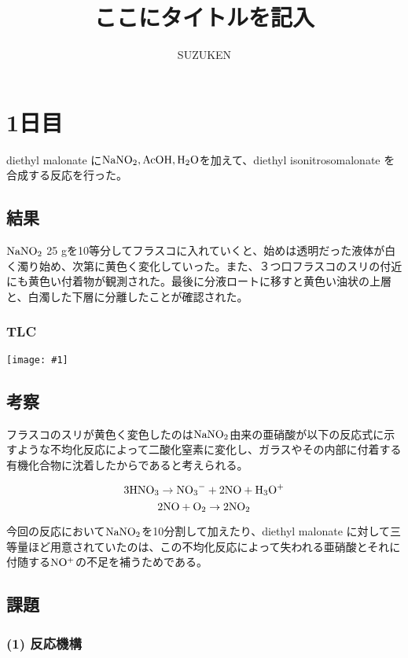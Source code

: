 \documentclass[a4paper,papersize,dvipdfmx]{jsarticle}
\newcommand{\pict}[2]{\begin{center} \texttt{[image: \#1]} \end{center}}   %
\begin{document}
\title{ここにタイトルを記入}
\author{SUZUKEN}
\date{}
\maketitle


\section*{1日目}
diethyl malonate に$\rm{NaNO_2, AcOH, H_2O}$を加えて、diethyl isonitrosomalonate を合成する反応を行った。


\subsection*{結果}
$\rm NaNO_2$ 25 gを10等分してフラスコに入れていくと、始めは透明だった液体が白く濁り始め、次第に黄色く変化していった。また、３つ口フラスコのスリの付近にも黄色い付着物が観測された。最後に分液ロートに移すと黄色い油状の上層と、白濁した下層に分離したことが確認された。

\subsubsection*{TLC}

\pict{imgs1/tlc.jpeg}{6}

\subsection*{考察}

フラスコのスリが黄色く変色したのは$\rm NaNO_2$由来の亜硝酸が以下の反応式に示すような不均化反応によって二酸化窒素に変化し、ガラスやその内部に付着する有機化合物に沈着したからであると考えられる。

\[\rm 3HNO_3 \rightarrow N{O_3}^- + 2NO + H_3O^+\]
\[\rm 2NO + O_2 \rightarrow 2NO_2\]

今回の反応において$\rm NaNO_2$を10分割して加えたり、diethyl malonate に対して三等量ほど用意されていたのは、この不均化反応によって失われる亜硝酸とそれに付随する$\rm NO^+$の不足を補うためである。

\subsection*{課題}
\subsubsection*{(1) 反応機構}
\end{document}
